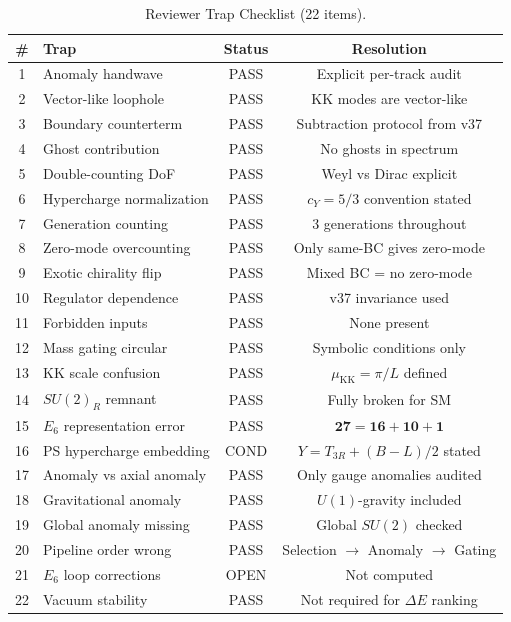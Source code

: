 \documentclass[11pt,a4paper]{article}
\begin{document}
\begin{table}[h]
\centering
\caption{Reviewer Trap Checklist (22 items).}
\label{tab:traps}
\begin{tabular}{clcc}
\toprule
\# & Trap & Status & Resolution \\
\midrule
1 & Anomaly handwave & PASS & Explicit per-track audit \\
2 & Vector-like loophole & PASS & KK modes are vector-like \\
3 & Boundary counterterm & PASS & Subtraction protocol from v37 \\
4 & Ghost contribution & PASS & No ghosts in spectrum \\
5 & Double-counting DoF & PASS & Weyl vs Dirac explicit \\
6 & Hypercharge normalization & PASS & $c_Y = 5/3$ convention stated \\
7 & Generation counting & PASS & 3 generations throughout \\
8 & Zero-mode overcounting & PASS & Only same-BC gives zero-mode \\
9 & Exotic chirality flip & PASS & Mixed BC = no zero-mode \\
10 & Regulator dependence & PASS & v37 invariance used \\
11 & Forbidden inputs & PASS & None present \\
12 & Mass gating circular & PASS & Symbolic conditions only \\
13 & KK scale confusion & PASS & $\mu_{\text{KK}} = \pi/L$ defined \\
14 & $SU(2)_R$ remnant & PASS & Fully broken for SM \\
15 & $E_6$ representation error & PASS & $\mathbf{27} = \mathbf{16} + \mathbf{10} + \mathbf{1}$ \\
16 & PS hypercharge embedding & COND & $Y = T_{3R} + (B-L)/2$ stated \\
17 & Anomaly vs axial anomaly & PASS & Only gauge anomalies audited \\
18 & Gravitational anomaly & PASS & $U(1)$-gravity included \\
19 & Global anomaly missing & PASS & Global $SU(2)$ checked \\
20 & Pipeline order wrong & PASS & Selection $\to$ Anomaly $\to$ Gating \\
21 & $E_6$ loop corrections & OPEN & Not computed \\
22 & Vacuum stability & PASS & Not required for $\Delta E$ ranking \\
\bottomrule
\end{tabular}
\end{table}
\end{document}
